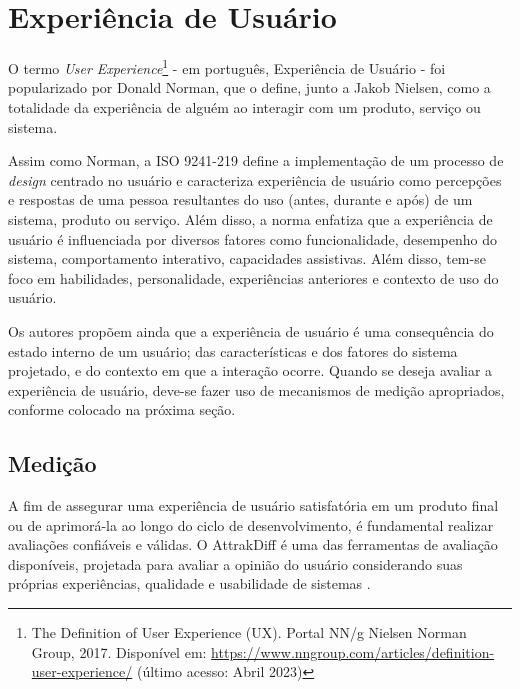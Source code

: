 \section{Experiência de Usuário}
\label{sec:Experiência de Usuário}

O termo \textit{User Experience}\footnote{The Definition of User Experience (UX). Portal NN/g Nielsen Norman Group, 2017. Disponível
em: \url{https://www.nngroup.com/articles/definition-user-experience/} (último acesso: Abril 2023)} - em português, Experiência de Usuário - foi popularizado por Donald Norman, 
que o define, junto a Jakob Nielsen, como a totalidade da experiência de alguém ao interagir com um produto, serviço ou sistema. 

Assim como Norman, a ISO 9241-219 \cite{iso9241210} define a implementação de um processo de \textit{design} centrado no usuário e caracteriza experiência de usuário como percepções e 
respostas de uma pessoa resultantes do uso (antes, durante e após) de um sistema, produto ou serviço. Além disso, a norma enfatiza que a experiência de usuário 
é influenciada por diversos fatores como funcionalidade, desempenho do sistema, comportamento interativo, capacidades assistivas. Além disso, tem-se foco em habilidades, 
personalidade, experiências anteriores e contexto de uso do usuário.

Os autores  propõem ainda que a experiência de usuário é uma consequência do estado interno de um usuário; das características e dos fatores do sistema projetado, 
e do contexto em que a interação ocorre. Quando se deseja avaliar a experiência de usuário, deve-se fazer uso de mecanismos de medição apropriados, conforme colocado na próxima seção.

\subsection{Medição}
\label{sec:Medição2}

A fim de assegurar uma experiência de usuário satisfatória em um produto final ou de aprimorá-la ao longo do ciclo de desenvolvimento, é fundamental realizar avaliações confiáveis e válidas. 
O AttrakDiff é uma das ferramentas de avaliação disponíveis, projetada para avaliar a opinião do usuário considerando suas próprias experiências, qualidade e usabilidade de sistemas \cite{hassenzahl2003}. 

